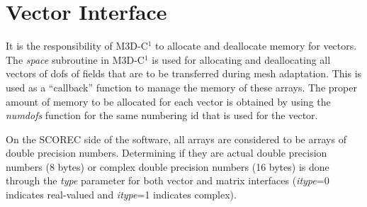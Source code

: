 \section{Vector Interface}
It is the responsibility of M3D-C$^1$ to allocate and deallocate memory for vectors.  The \textit{space}
subroutine in M3D-C$^1$ is used for allocating and deallocating all vectors of dofs of fields
that are to be transferred during mesh adaptation.  This is used as a ``callback'' function to 
manage the memory of these arrays.  The proper amount of memory to be allocated for each vector
is obtained by using the \textit{numdofs} function for the same numbering id that is used
for the vector.

On the SCOREC side of the software, all arrays are considered to be arrays of double precision numbers.
Determining if they are actual double precision numbers (8 bytes) or complex double precision numbers
(16 bytes) is done through the \textit{type} parameter for both vector and matrix interfaces 
(\textit{itype}=0 indicates real-valued and \textit{itype}=1 indicates complex).  

